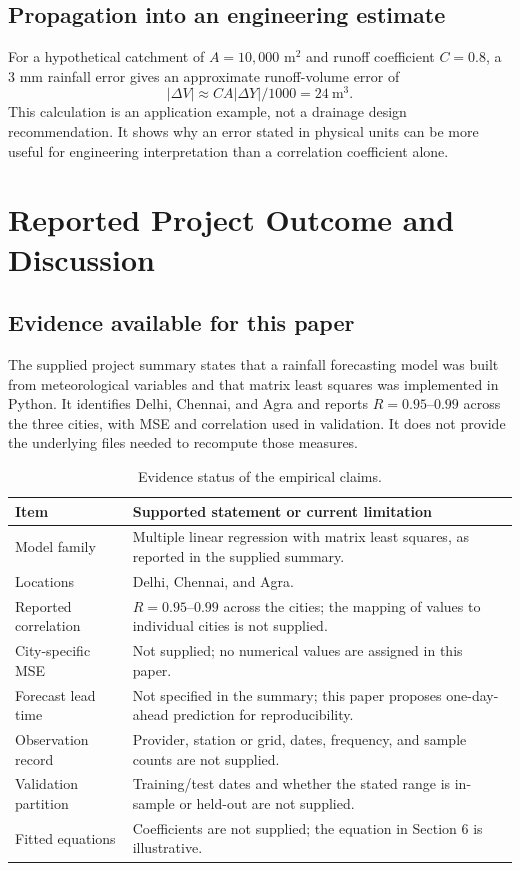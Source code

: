 \documentclass[11pt,a4paper]{article}
\newcommand{\sectionpage}[1]{\clearpage\section{#1}}
\begin{document}
\subsection{Propagation into an engineering estimate}
For a hypothetical catchment of $A=10{,}000$ m$^2$ and runoff coefficient $C=0.8$, a 3 mm rainfall error gives an approximate runoff-volume error of
\begin{equation}
|\Delta V|\approx C A|\Delta Y|/1000=24\ \mathrm{m}^3.
\end{equation}
This calculation is an application example, not a drainage design recommendation. It shows why an error stated in physical units can be more useful for engineering interpretation than a correlation coefficient alone.

\sectionpage{Reported Project Outcome and Discussion}
\subsection{Evidence available for this paper}
The supplied project summary states that a rainfall forecasting model was built from meteorological variables and that matrix least squares was implemented in Python. It identifies Delhi, Chennai, and Agra and reports $R=0.95$--$0.99$ across the three cities, with MSE and correlation used in validation. It does not provide the underlying files needed to recompute those measures.

\begin{table}[h!]\centering\small
\begin{tabularx}{\textwidth}{@{}lX@{}}\toprule
Item & Supported statement or current limitation\\\midrule
Model family & Multiple linear regression with matrix least squares, as reported in the supplied summary.\\
Locations & Delhi, Chennai, and Agra.\\
Reported correlation & $R=0.95$--$0.99$ across the cities; the mapping of values to individual cities is not supplied.\\
City-specific MSE & Not supplied; no numerical values are assigned in this paper.\\
Forecast lead time & Not specified in the summary; this paper proposes one-day-ahead prediction for reproducibility.\\
Observation record & Provider, station or grid, dates, frequency, and sample counts are not supplied.\\
Validation partition & Training/test dates and whether the stated range is in-sample or held-out are not supplied.\\
Fitted equations & Coefficients are not supplied; the equation in Section 6 is illustrative.\\\bottomrule
\end{tabularx}
\caption{Evidence status of the empirical claims.}
\end{table}
\end{document}

